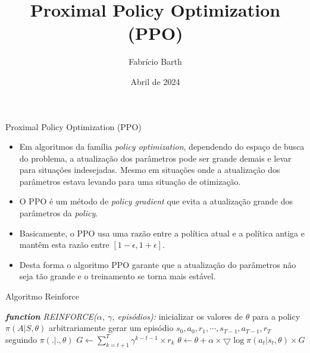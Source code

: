 \documentclass{beamer}
\begin{document}
	
\title{Proximal Policy Optimization (PPO)} 
\author{Fabrício Barth}
\date{Abril de 2024}
	
\maketitle

\def\HiLi{\leavevmode\rlap{\hbox to \hsize{\color{yellow!50}\leaders\hrule height .8\baselineskip depth .5ex\hfill}}}
	
\def\TA{\leavevmode\rlap{\hbox to \hsize{\color{cyan!50}\leaders\hrule height .8\baselineskip depth .5ex\hfill}}}

\def\TB{\leavevmode\rlap{\hbox to \hsize{\color{red!50}\leaders\hrule height .8\baselineskip depth .5ex\hfill}}}
	
\begin{frame}{Proximal Policy Optimization (PPO)}
	\begin{itemize}
		\item Em algoritmos da família \textit{policy optimization}, dependendo do espaço de busca do problema, a atualização dos parâmetros pode ser grande demais e levar para situações indesejadas. Mesmo em situações onde a atualização dos parâmetros estava levando para uma situação de otimização. 
		\item O PPO é um método de \textit{policy gradient} que evita a atualização grande dos parâmetros da \textit{policy}.
		\item Basicamente, o PPO usa uma razão entre a política atual e a política antiga e mantêm esta razão entre $\left[ 1 - \epsilon, 1 + \epsilon \right]$.
		\item Desta forma o algoritmo PPO garante que a atualização do parâmetros não seja tão grande e o treinamento se torna mais estável. 
	\end{itemize}
	
	
\end{frame}
	

\begin{frame}{Algoritmo Reinforce}
	\begin{algorithmic} 
		\STATE \emph{\textbf{function} REINFORCE($\alpha$, $\gamma$, episódios):}
		\STATE inicializar os valores de $\theta$ para a policy $\pi(A|S,\theta)$ arbitrariamente
		\STATE gerar um episódio ${s_{0},a_{0},r_{1},\cdots,s_{T-1},a_{T-1},r_{T}}$ seguindo $\pi(.|.,\theta)$
			\STATE $G \leftarrow \sum_{k=t+1}^{T} \gamma^{k-t-1} \times r_{k}$
			\STATE $\theta \leftarrow \theta + \alpha \times \bigtriangledown \log \pi(a_{t}|s_{t}, \theta) \times G$
		\ENDFOR
		\ENDFOR
	\end{algorithmic}
\end{frame}
\end{document}

